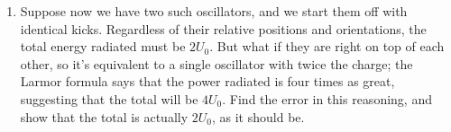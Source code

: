 \documentclass[fleqn]{article}
\begin{document}
\begin{enumerate}
\begin{enumerate}

      \item Suppose now we have two such oscillators, and we start them off with identical
      kicks. Regardless of their relative positions and orientations, the total energy
      radiated must be $2 U_0$. But what if they are right on top of each other, so it's
      equivalent to a single oscillator with twice the charge; the Larmor formula says
      that the power radiated is four times as great, suggesting that the total will be
      $4 U_0$. Find the error in this reasoning, and show that the total is actually $2 U_0$, as
      it should be.


    \end{enumerate}

  \end{enumerate}
\end{document}
